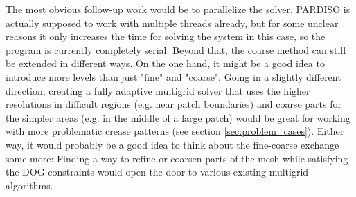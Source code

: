 \documentclass[a4paper,twoside,12pt,nochapterprefix]{scrbook}
\begin{document}
The most obvious follow-up work would be to parallelize the solver. PARDISO is actually supposed to work with multiple threads already, but for some unclear reasons it only increases the time for solving the system in this case, so the program is currently completely serial.\newline
Beyond that, the coarse method can still be extended in different ways. On the one hand, it might be a good idea to introduce more levels than just "fine" and "coarse". Going in a slightly different direction, creating a fully adaptive multigrid solver that uses the higher resolutions in difficult regions  (e.g. near patch boundaries) and coarse parts for the simpler areas (e.g. in the middle of a large patch) would be great for working with more problematic crease patterns (see section \ref{sec:problem_cases}). Either way, it would probably be a good idea to think about the fine-coarse exchange some more: Finding a way to refine or coarsen parts of the mesh while satisfying the DOG constraints would open the door to various existing multigrid algorithms.\newline


\appendix
\cleardoublepage
{}
{}

%
\end{document}
